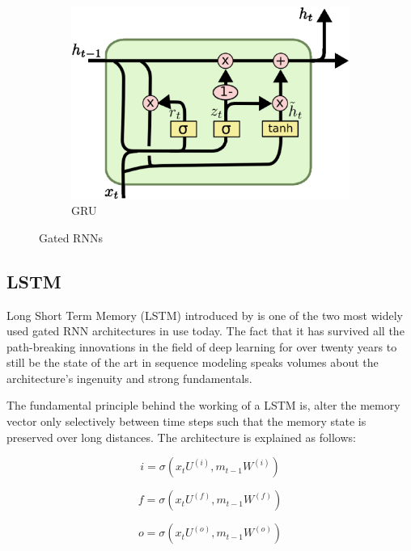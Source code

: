 \begin{figure}[ht]
\begin{subfigure}[b]{0.5\linewidth}
		\else
		\includegraphics[width=0.95\linewidth]{./figs/Gru-eps}
		\fi 
		\caption{GRU \citep{olah}} 
		\label{gru}  
		\vspace{4ex}
	\end{subfigure}
	\caption{Gated RNNs}
	\label{conf}
\end{figure}

\subsection{LSTM}
Long Short Term Memory (LSTM) introduced by \cite{LSTM} is one of the two most widely used gated RNN architectures in use today. The fact that it has survived all the path-breaking innovations in the field of deep learning for over twenty years to still be the state of the art in sequence modeling speaks volumes about the architecture's ingenuity and strong fundamentals. 

The fundamental principle behind the working of a LSTM is, alter the memory vector only selectively between time steps such that the memory state is preserved over long distances. The architecture is explained as follows:


\begin{equation}
i= \sigma(x_t U^{(i)}, m_{t-1}W^{(i)})
\end{equation}

\begin{equation}
f= \sigma(x_t U^{(f)}, m_{t-1}W^{(f)})
\end{equation}

\begin{equation}
o= \sigma(x_t U^{(o)}, m_{t-1}W^{(o)})
\end{equation}


